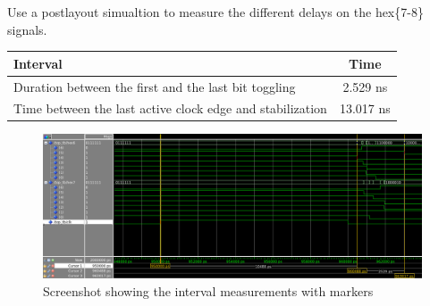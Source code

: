 \documentclass[10pt,a4paper,titlepage,oneside]{article}
\begin{document}
\begin{qa}{Use a postlayout simualtion to measure the different delays on the \textsf{hex\{7-8\}} signals.}

\begin{center}
\begin{tabular}{lc}
	\hline
	Interval                                                  & Time \\ \hline\hline
	Duration between the first and the last bit toggling      &  2.529 ns \\
	Time between the last active clock edge and stabilization &  13.017 ns \\\hline
\end{tabular}
\end{center}

\begin{figure}[h!]
	\centering
	\includegraphics[width=1.0\linewidth]{dia/Subtask6.png}
	\caption{Screenshot showing the interval measurements with markers}
\end{figure}

\end{qa}



\end{document}
